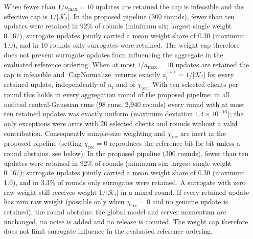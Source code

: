 When fewer than \(1/a_{\max}=10\) updates are retained the cap is infeasible and the effective cap is \(1/|\mathcal{K}_t|\). In the proposed pipeline (300 rounds), fewer than ten updates were retained in 92\% of rounds (minimum six; largest single weight 0.167), surrogate updates jointly carried a mean weight share of 0.30 (maximum 1.0), and in 10 rounds only surrogates were retained. The weight cap therefore does not prevent surrogate updates from influencing the aggregate in the evaluated reference ordering.
When at most \(1/a_{\max}=10\) updates are retained the cap is infeasible and \(\operatorname{CapNormalize}\) returns exactly \(a_i^{(t)}=1/|\mathcal{K}_t|\) for every retained update, independently of \(n_i\) and of \(\chi_{\mathrm{rec}}\). With ten selected clients per round this holds in every aggregation round of the proposed pipeline: in all audited central-Gaussian runs (98 runs, 2{,}940 rounds) every round with at most ten retained updates was exactly uniform (maximum deviation \(1.4\times10^{-16}\)); the only exceptions were arms with 20 selected clients and rounds without a valid contribution. Consequently sample-size weighting and \(\chi_{\mathrm{rec}}\) are inert in the proposed pipeline (setting \(\chi_{\mathrm{rec}}=0\) reproduces the reference bit-for-bit unless a round abstains, see below). In the proposed pipeline (300 rounds), fewer than ten updates were retained in 92\% of rounds (minimum six; largest single weight 0.167); surrogate updates jointly carried a mean weight share of 0.30 (maximum 1.0), and in 3.3\% of rounds only surrogates were retained. A surrogate with zero raw weight still receives weight \(1/|\mathcal{K}_t|\) in a mixed round. If every retained update has zero raw weight (possible only when \(\chi_{\mathrm{rec}}=0\) and no genuine update is retained), the round abstains: the global model and server momentum are unchanged, no noise is added and no release is counted. The weight cap therefore does not limit surrogate influence in the evaluated reference ordering.

